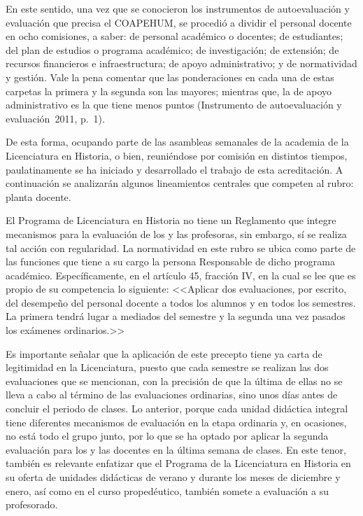 {En este sentido, una vez que se conocieron los instrumentos de
autoevaluación y evaluación que precisa el COAPEHUM, se procedió a dividir
el personal docente en ocho comisiones, a saber: de personal académico o
docentes; de estudiantes; del plan de estudios o programa académico; de
investigación; de extensión; de recursos financieros e infraestructura; de
apoyo administrativo; y de normatividad y gestión. Vale la pena comentar
que las ponderaciones en cada una de estas carpetas la primera y la segunda
son las mayores; mientras que, la de apoyo administrativo es la que tiene
menos puntos (Instrumento de autoevaluación y evaluación~2011, p.~1).

De esta forma, ocupando parte de las asambleas semanales de la academia de
la Licenciatura en Historia, o bien, reuniéndose por comisión en distintos
tiempos, paulatinamente se ha iniciado y desarrollado el trabajo de esta
acreditación. A continuación se analizarán algunos lineamientos centrales
que competen al rubro: planta docente. 

El Programa de Licenciatura en Historia no tiene un Reglamento que integre
mecanismos para la evaluación de los y las profesoras, sin embargo, sí se
realiza tal acción con regularidad. La normatividad en este rubro se ubica
como parte de las funciones que tiene a su cargo la persona Responsable de
dicho programa académico. Específicamente, en el artículo 45, fracción IV,
en la cual se lee que es propio de su competencia lo siguiente: <<Aplicar
dos evaluaciones, por escrito, del desempeño del personal docente a todos
los alumnos y en todos los semestres. La primera tendrá lugar a mediados
del semestre y la segunda una vez pasados los exámenes ordinarios.>> 


Es importante señalar que la aplicación de este precepto tiene ya carta de
legitimidad en la Licenciatura, puesto que cada semestre se realizan las
dos evaluaciones que se mencionan, con la precisión de que la última de
ellas no se lleva a cabo al término de las evaluaciones ordinarias, sino
unos días antes de concluir el periodo de clases. Lo anterior, porque cada
unidad didáctica integral tiene diferentes mecanismos de evaluación en la
etapa ordinaria y, en ocasiones, no está todo el grupo junto, por lo que se
ha optado por aplicar la segunda evaluación para los y las docentes en la
última semana de clases. En este tenor, también es relevante enfatizar que
el Programa de la Licenciatura en Historia en su oferta de unidades
didácticas de verano y durante los meses de diciembre y enero, así como en
el curso propedéutico, también somete a evaluación a su profesorado.

}
